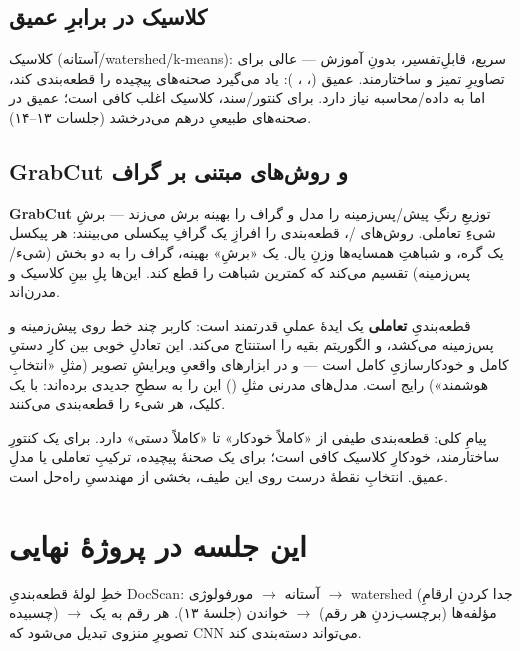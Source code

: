 \documentclass[12pt,a4paper]{article}
\begin{document}
\subsection{کلاسیک در برابرِ عمیق}

کلاسیک (آستانه/watershed/k-means): سریع، قابلِ‌تفسیر، بدونِ آموزش — عالی برای تصاویرِ تمیز و
ساختارمند. عمیق (، ، ): یاد می‌گیرد صحنه‌های پیچیده را قطعه‌بندی
کند، اما به داده/محاسبه نیاز دارد. برای کنتور/سند، کلاسیک اغلب کافی است؛ عمیق در صحنه‌های طبیعیِ
درهم می‌درخشد (جلسات ۱۳–۱۴).

\subsection{GrabCut و روش‌های مبتنی بر گراف}

\textbf{GrabCut} توزیعِ رنگِ پیش/پس‌زمینه را مدل و گراف را بهینه برش می‌زند — برشِ شیءِ تعاملی.
روش‌های /، قطعه‌بندی را افرازِ یک گرافِ پیکسلی می‌بینند: هر پیکسل
یک گره، و شباهتِ همسایه‌ها وزنِ یال. یک «برشِ» بهینه، گراف را به دو بخش (شیء/پس‌زمینه) تقسیم می‌کند
که کمترین شباهت را قطع کند. این‌ها پلِ بینِ کلاسیک و مدرن‌اند.

قطعه‌بندیِ \textbf{تعاملی} یک ایدهٔ عملیِ قدرتمند است: کاربر چند خط روی پیش‌زمینه و پس‌زمینه می‌کشد،
و الگوریتم بقیه را استنتاج می‌کند. این تعادلِ خوبی بین کارِ دستیِ کامل و خودکارسازیِ کامل است — و
در ابزارهای واقعیِ ویرایشِ تصویر (مثلِ «انتخابِ هوشمند») رایج است. مدل‌های مدرنی مثلِ 
() این را به سطحِ جدیدی برده‌اند: با یک کلیک، هر شیء را قطعه‌بندی می‌کنند.

\begin{yaddasht}
پیامِ کلی: قطعه‌بندی طیفی از «کاملاً خودکار» تا «کاملاً دستی» دارد. برای یک کنتورِ ساختارمند،
خودکارِ کلاسیک کافی است؛ برای یک صحنهٔ پیچیده، ترکیبِ تعاملی یا مدلِ عمیق. انتخابِ نقطهٔ درست روی
این طیف، بخشی از مهندسیِ راه‌حل است.
\end{yaddasht}

\section{این جلسه در پروژهٔ نهایی}

خطِ لولهٔ قطعه‌بندیِ DocScan: آستانه $\rightarrow$ مورفولوژی $\rightarrow$ watershed (جدا کردنِ
ارقامِ چسبیده) $\rightarrow$ مؤلفه‌ها (برچسب‌زدنِ هر رقم) $\rightarrow$ خواندن (جلسهٔ ۱۳). هر رقم به
یک تصویرِ منزوی تبدیل می‌شود که CNN می‌تواند دسته‌بندی کند.
\end{document}
